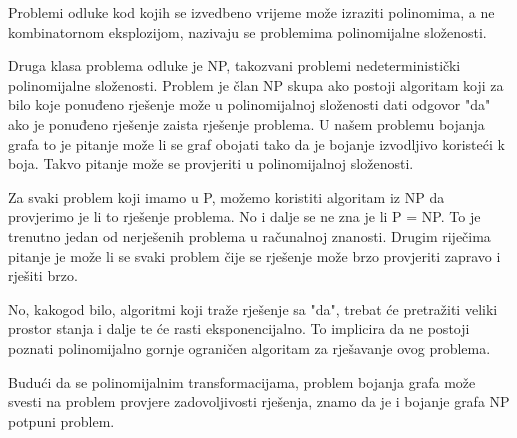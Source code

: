\documentclass[times, utf8, zavrsni, numeric]{fer}
\begin{document}
Problemi odluke kod kojih se izvedbeno vrijeme može izraziti polinomima, a ne kombinatornom eksplozijom, nazivaju se problemima polinomijalne složenosti.\par
Druga klasa problema odluke je NP, takozvani problemi nedeterministički polinomijalne složenosti. Problem je član NP skupa ako postoji algoritam koji za bilo koje ponuđeno rješenje može u polinomijalnoj složenosti  dati odgovor "da" ako je ponuđeno rješenje zaista rješenje problema. U našem problemu bojanja grafa  to je pitanje može li se graf obojati tako da je bojanje izvodljivo koristeći k boja. Takvo pitanje može se provjeriti u polinomijalnoj složenosti.\par
Za svaki problem koji imamo u P, možemo koristiti algoritam iz NP da provjerimo je li to rješenje problema. No i dalje se ne zna je li P = NP. To je trenutno jedan od nerješenih problema u računalnoj znanosti. Drugim riječima pitanje je može li se svaki problem čije se rješenje može brzo provjeriti zapravo i rješiti brzo.\par
No, kakogod bilo, algoritmi koji traže rješenje sa "da", trebat će pretražiti veliki prostor stanja i dalje te će rasti eksponencijalno. To implicira da ne postoji poznati polinomijalno gornje ograničen algoritam za rješavanje ovog problema.\par
Budući da se polinomijalnim transformacijama, problem bojanja grafa može svesti na problem provjere zadovoljivosti rješenja, znamo da je i bojanje grafa NP potpuni problem. 


\newpage
\end{document}
